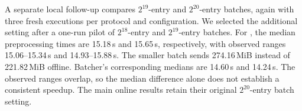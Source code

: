 A separate local follow-up compares $2^{19}$-entry and $2^{20}$-entry batches,
again with three fresh executions per protocol and configuration.
We selected the additional setting after a one-run pilot of $2^{18}$-entry and $2^{19}$-entry batches.
For \ourprotocol, the median preprocessing times are 15.18\,s and 15.65\,s, respectively,
with observed ranges 15.06--15.34\,s and 14.93--15.88\,s.
The smaller batch sends 274.16\,MiB instead of 221.82\,MiB offline.
Batcher's corresponding medians are 14.60\,s and 14.24\,s.
The observed ranges overlap, so the median difference alone does not establish a consistent speedup.
The main online results retain their original $2^{20}$-entry batch setting.
